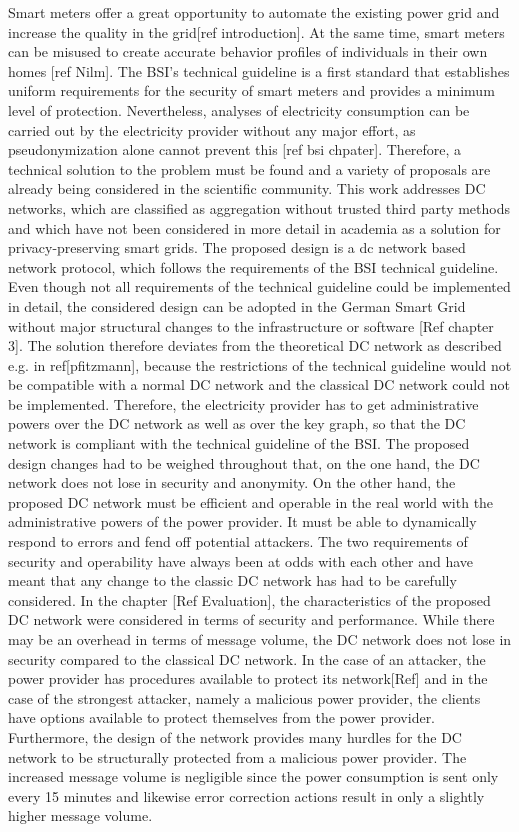 Smart meters offer a great opportunity to automate the existing power grid and increase the quality in the grid[ref introduction]. At the same time, smart meters can be misused to create accurate behavior profiles of individuals in their own homes [ref Nilm]. The BSI's technical guideline is a first standard that establishes uniform requirements for the security of smart meters and provides a minimum level of protection. Nevertheless, analyses of electricity consumption can be carried out by the electricity provider without any major effort, as pseudonymization alone cannot prevent this [ref bsi chpater]. Therefore, a technical solution to the problem must be found and a variety of proposals are already being considered in the scientific community. This work addresses DC networks, which are classified as aggregation without trusted third party methods and which have not been considered in more detail in academia as a solution for privacy-preserving smart grids. The proposed design is a dc network based network protocol, which follows the requirements of the BSI technical guideline. Even though not all requirements of the technical guideline could be implemented in detail, the considered design can be adopted in the German Smart Grid without major structural changes to the infrastructure or software [Ref chapter 3]. The solution therefore deviates from the theoretical DC network as described e.g. in ref[pfitzmann], because the restrictions of the technical guideline would not be compatible with a normal DC network and the classical DC network could not be implemented. Therefore, the electricity provider has to get administrative powers over the DC network as well as over the key graph, so that the DC network is compliant with the technical guideline of the BSI. The proposed design changes had to be weighed throughout that, on the one hand, the DC network does not lose in security and anonymity. On the other hand, the proposed DC network must be efficient and operable in the real world with the administrative powers of the power provider. It must be able to dynamically respond to errors and fend off potential attackers. The two requirements of security and operability have always been at odds with each other and have meant that any change to the classic DC network has had to be carefully considered. 
In the chapter [Ref Evaluation], the characteristics of the proposed DC network were considered in terms of security and performance. While there may be an overhead in terms of message volume, the DC network does not lose in security compared to the classical DC network. In the case of an attacker, the power provider has procedures available to protect its network[Ref] and in the case of the strongest attacker, namely a malicious power provider, the clients have options available to protect themselves from the power provider. Furthermore, the design of the network provides many hurdles for the DC network to be structurally protected from a malicious power provider. The increased message volume is negligible since the power consumption is sent only every 15 minutes and likewise error correction actions result in only a slightly higher message volume.
